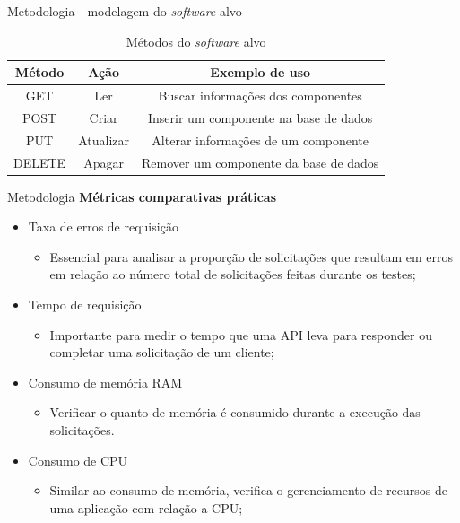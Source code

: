 \documentclass{libs/ufc_format}
\begin{document}
\begin{frame}{Metodologia - modelagem do \textit{software} alvo}
    \begin{table}[h!] 
        \centering
        \captionsetup{justification=centering}
        \caption{Métodos do \textit{software} alvo}
        \begin{tabular}{ccc}
            \hline
            \textbf{Método} & \textbf{Ação} & \textbf{Exemplo de uso} \\ \hline
            GET & Ler & Buscar informações dos componentes \\ 
            POST & Criar & Inserir um componente na base de dados \\ 
            PUT & Atualizar & Alterar informações de um componente \\ 
            DELETE & Apagar & Remover um componente da base de dados \\ 
            \hline
        \end{tabular}
        \label{tab:metodos-http}
    \end{table}
\end{frame}

\begin{frame}{Metodologia}
    \textbf{Métricas comparativas práticas}
    \begin{itemize}
        \item Taxa de erros de requisição
            \begin{itemize}
                \item Essencial para analisar a proporção de solicitações que resultam em erros em relação ao número total de solicitações feitas durante os testes;
            \end{itemize}
        \item Tempo de requisição
            \begin{itemize}
                \item Importante para medir o tempo que uma API leva para responder ou completar uma solicitação de um cliente;
            \end{itemize}
        \item Consumo de memória RAM
            \begin{itemize}
                \item Verificar o quanto de memória é consumido durante a execução das solicitações.
            \end{itemize}
        \item Consumo de CPU
            \begin{itemize}
                \item Similar ao consumo de memória, verifica o gerenciamento de recursos de uma aplicação com relação a CPU;
            \end{itemize}
    \end{itemize}
\end{frame}
\end{document}
